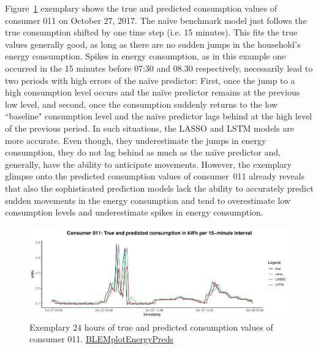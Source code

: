 Figure~\ref{Fig:glimpse_predcons} exemplary shows the true and predicted consumption values of consumer 011 on October 27, 2017. The na\"ive benchmark model just follows the true consumption shifted by one time step (i.e. 15 minutes). This fits the true values generally good, as long as there are no sudden jumps in the household's energy consumption. Spikes in energy consumption, as in this example one occurred in the 15 minutes before 07:30 and 08.30 respectively, necessarily lead to two periods with high errors of the na\"ive predictor: First, once the jump to a high consumption level occurs and the na\"ive predictor remains at the previous low level, and second, once the consumption suddenly returns to the low ``baseline" consumption level and the na\"ive predictor lags behind at the high level of the previous period. In such situations, the LASSO and LSTM models are more accurate. Even though, they underestimate the jumps in energy consumption, they do not lag behind as much as the na\"ive predictor and, generally, have the ability to anticipate movements. However, the exemplary glimpse onto the predicted consumption values of consumer~011 already reveals that also the sophisticated prediction models lack the ability to accurately predict sudden movements in the energy consumption and tend to overestimate low consumption levels and underestimate spikes in energy consumption.
%
\begin{figure}[htbp]
    \centering
    \includegraphics[width=\textwidth]{thesis/graphs/evaluation/c011_pred_cons.pdf}
    \caption[Exemplary 24 hours of true and predicted consumption values]{Exemplary 24 hours of true and predicted consumption values of consumer 011. \quantnet\href{https://github.com/QuantLet/BLEM/tree/master/BLEMplotEnergyPreds}{BLEMplotEnergyPreds}}
    \label{Fig:glimpse_predcons}
\end{figure}
%

